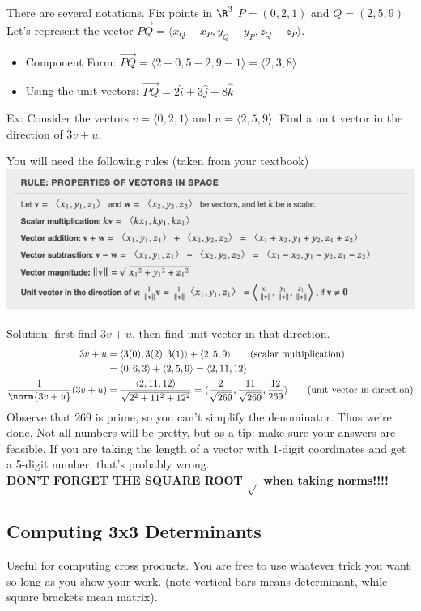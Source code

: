 \documentclass[]{mangos-musings}
\begin{document}
There are several notations. Fix points in $\R^3$ $P = (0, 2, 1)$ and $Q = (2, 5, 9)$
\\ Let's represent the vector $\overrightarrow{PQ} = \langle x_Q - x_P, y_Q - y_P, z_Q - z_P\rangle$.
\begin{itemize}
  \item Component Form: $\overrightarrow{PQ} = \langle 2-0, 5-2, 9-1\rangle = \langle 2, 3, 8\rangle$
  \item Using the unit vectors: $\overrightarrow{PQ} = 2\hat{i} + 3\hat{j} + 8\hat{k}$
\end{itemize}

Ex: Consider the vectors $v = \langle 0, 2, 1\rangle$ and $u = \langle 2, 5, 9\rangle$. Find a unit vector in the direction of $3v + u$. 

You will need the following rules (taken from your textbook)
\\ \includegraphics{assets/rec01-vectorspace.png}

Solution: first find $3v + u$, then find unit vector in that direction.
\begin{align*}
  3v + u &= \langle 3(0), 3(2), 3(1)\rangle + \langle 2, 5, 9\rangle \tag{scalar multiplication}
  \\ &=  \langle 0, 6, 3\rangle +  \langle 2, 5, 9\rangle 
  = \langle 2, 11, 12\rangle
  \\ \dfrac{1}{\norm{3v + u}} (3v + u) &= \dfrac{\langle 2, 11, 12\rangle}{\sqrt{2^2 + 11^2 + 12^2}} =  \langle \dfrac{2}{\sqrt{269}}, \dfrac{11}{\sqrt{269}}, \dfrac{12}{269}\rangle \tag{unit vector in direction}
\end{align*}
Observe that $269$ is prime, so you can't simplify the denominator. Thus we're done. Not all numbers will be pretty, but as a tip: make sure your answers are feasible. If you are taking the length of a vector with 1-digit coordinates and get a 5-digit number, that's probably wrong. 
\\ \textbf{DON'T FORGET THE SQUARE ROOT $\sqrt{}$ when taking norms!!!!}

\newpage
\subsection{Computing 3x3 Determinants}
Useful for computing cross products. You are free to use whatever trick you want so long as you show your work. (note vertical bars means determinant, while square brackets mean matrix). 
\end{document}
